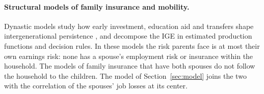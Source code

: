 \paragraph{Structural models of family insurance and mobility.} Dynastic models study how early investment, education
aid and transfers shape intergenerational persistence \citep{lee2019intergenerational, caucutt2020early,
abbott2019education, daruich2018macroeconomic}, and \citet{bolt2024intergenerational} decompose the IGE in estimated
production functions and decision rules. In these models the risk parents face is at most their own earnings risk:
none has a spouse's employment risk or insurance within the household. The models of family insurance that have both
spouses \citep{blundell2016consumption, birinci2019spousal, mankart2017household} do not follow the household to the
children. The model of Section~\ref{sec:model} joins the two with the correlation of the spouses' job losses at its
center.

